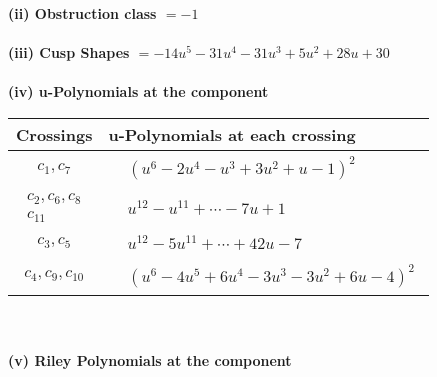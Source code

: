 \documentclass[1p]{elsarticle_modified}
\theoremstyle{definition}
\begin{document}
\flushleft \textbf{(ii) Obstruction class $= -1$}\\~\\
\flushleft \textbf{(iii) Cusp Shapes $= -14 u^5-31 u^4-31 u^3+5 u^2+28 u+30$}\\~\\
\newpage\renewcommand{\arraystretch}{1}
\flushleft \textbf{(iv) u-Polynomials at the component}\newline \\
\begin{tabular}{m{50pt}|m{274pt}}
Crossings & \hspace{64pt}u-Polynomials at each crossing \\
\hline $$\begin{aligned}c_{1},c_{7}\end{aligned}$$&$\begin{aligned}
&(u^6-2 u^4- u^3+3 u^2+u-1)^2
\end{aligned}$\\
\hline $$\begin{aligned}c_{2},c_{6},c_{8}\\c_{11}\end{aligned}$$&$\begin{aligned}
&u^{12}- u^{11}+\cdots-7 u+1
\end{aligned}$\\
\hline $$\begin{aligned}c_{3},c_{5}\end{aligned}$$&$\begin{aligned}
&u^{12}-5 u^{11}+\cdots+42 u-7
\end{aligned}$\\
\hline $$\begin{aligned}c_{4},c_{9},c_{10}\end{aligned}$$&$\begin{aligned}
&(u^6-4 u^5+6 u^4-3 u^3-3 u^2+6 u-4)^2
\end{aligned}$\\
\hline
\end{tabular}\\~\\
\newpage\renewcommand{\arraystretch}{1}
\flushleft \textbf{(v) Riley Polynomials at the component}\newline \\
\end{document}
